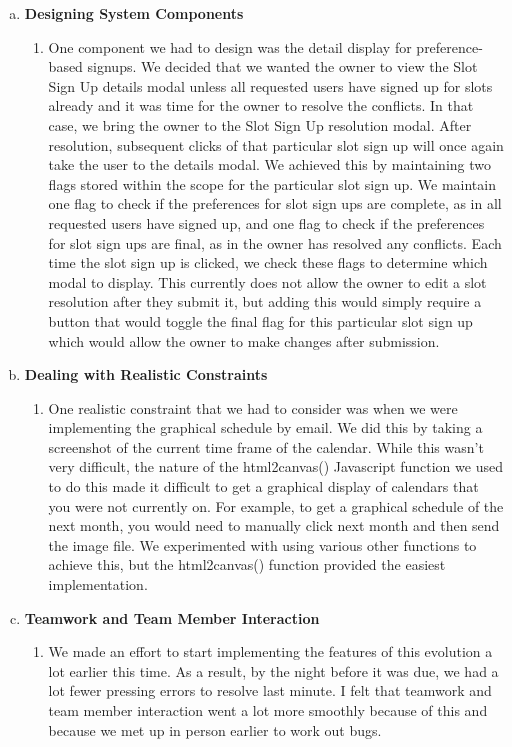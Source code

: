 \documentclass[11pt]{article}   %
\begin{document}
\begin{enumerate} [a)]
\begin{enumerate} [$\cdot$]
\end{enumerate}
\item {\bf Designing System Components}
\begin{enumerate} [$\cdot$]
\item One component we had to design was the detail display for preference-based signups. We decided that we wanted the owner to view the Slot Sign Up details modal unless all requested users have signed up for slots already and it was time for the owner to resolve the conflicts. In that case, we bring the owner to the Slot Sign Up resolution modal. After resolution, subsequent clicks of that particular slot sign up will once again take the user to the details modal. We achieved this by maintaining two flags stored within the scope for the particular slot sign up. We maintain one flag to check if the preferences for slot sign ups are complete, as in all requested users have signed up, and one flag to check if the preferences for slot sign ups are final, as in the owner has resolved any conflicts. Each time the slot sign up is clicked, we check these flags to determine which modal to display. This currently does not allow the owner to edit a slot resolution after they submit it, but adding this would simply require a button that would toggle the final flag for this particular slot sign up which would allow the owner to make changes after submission. 
\end{enumerate}
\item {\bf Dealing with Realistic Constraints}
\begin{enumerate} [$\cdot$]
\item One realistic constraint that we had to consider was when we were implementing the graphical schedule by email. We did this by taking a screenshot of the current time frame of the calendar. While this wasn't very difficult, the nature of the html2canvas() Javascript function we used to do this made it difficult to get a graphical display of calendars that you were not currently on. For example, to get a graphical schedule of the next month, you would need to manually click next month and then send the image file. We experimented with using various other functions to achieve this, but the html2canvas() function provided the easiest implementation.
\end{enumerate}
\item  {\bf Teamwork and Team Member Interaction}
\begin{enumerate} [$\cdot$]
\item We made an effort to start implementing the features of this evolution a lot earlier this time. As a result, by the night before it was due, we had a lot fewer pressing errors to resolve last minute. I felt that teamwork and team member interaction went a lot more smoothly because of this and because we met up in person earlier to work out bugs.
\end{enumerate}
\end{enumerate}
\end{document}

